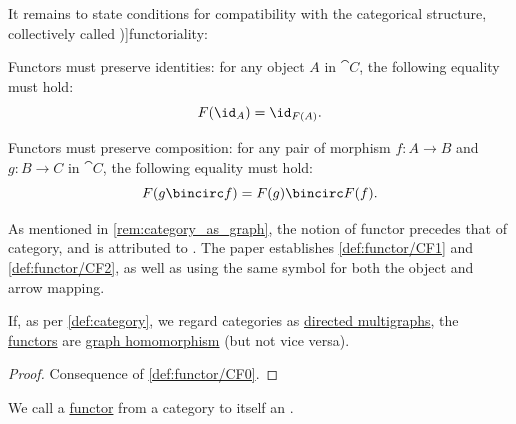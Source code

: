 \begin{definition}
  It remains to state conditions for compatibility with the categorical structure, collectively called \term[en=functoriality axioms (\cite[def. 1.3.1]{Perrone2024StartingCategoryTheory})]{functoriality}:
  \begin{thmenum}[resume=def:functor]
     Functors must preserve identities: for any object \( A \) in \( \cat{C} \), the following equality must hold:
    \begin{equation*}
      F(\id_A) = \id_{F(A)}.
    \end{equation*}

     Functors must preserve composition: for any pair of morphism \( f: A \to B \) and \( g: B \to C \) in \( \cat{C} \), the following equality must hold:
    \begin{equation*}
      F(g \bincirc f) = F(g) \bincirc F(f).
    \end{equation*}
  \end{thmenum}
\end{definition}
\begin{comments}
  \item As mentioned in \cref{rem:category_as_graph}, the notion of functor precedes that of category, and is attributed to \cite{EilenbergMacLane1942NaturalIsomorphisms}. The paper establishes \ref{def:functor/CF1} and \ref{def:functor/CF2}, as well as using the same symbol for both the object and arrow mapping.
\end{comments}

\begin{proposition}\label{thm:functor_is_graph_homomorphism}
  If, as per \cref{def:category}, we regard categories as \hyperref[def:directed_multigraph]{directed multigraphs}, the \hyperref[def:functor]{functors} are \hyperref[def:directed_multigraph/morphism]{graph homomorphism} (but not vice versa).
\end{proposition}
\begin{proof}
  Consequence of \ref{def:functor/CF0}.
\end{proof}

\begin{definition}\label{def:endofunctor}\mimprovised
  We call a \hyperref[def:functor]{functor} from a category to itself an .
\end{definition}

